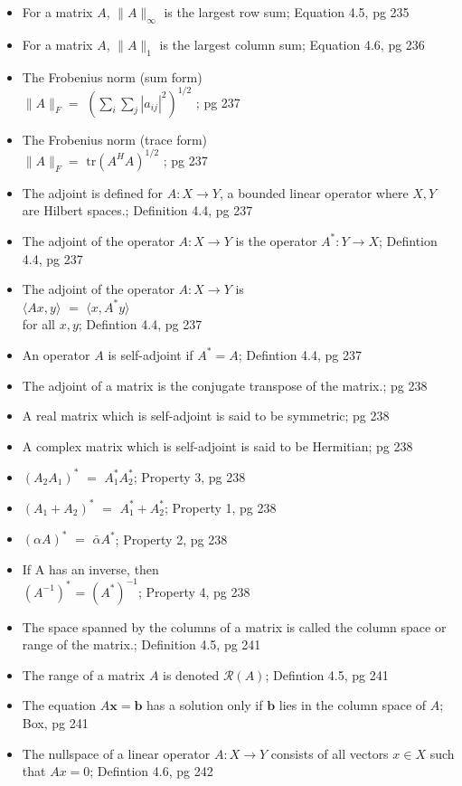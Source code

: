 \documentclass{article}
\begin{document}
\begin{multicols}{2}
\begin{itemize}
\item For a matrix $A$, $\|A\|_{\infty}$ is the largest row sum; Equation 4.5, pg 235
\item For a matrix $A$, $\|A\|_{1}$ is the largest column sum; Equation 4.6, pg 236
\item The Frobenius norm (sum form) \\
$\|A\|_F = $ $ \left( \sum_i \sum_j | a_{ij} |^2 \right)^{1/2} $ ; pg 237
\item The Frobenius norm (trace form) \\
$\|A\|_F = $ $ \mathrm{tr}(A^H A)^{1/2} $ ; pg 237
\item The adjoint is defined for $A: X \to Y$, a bounded linear operator where $X,Y$ are Hilbert spaces.; Definition 4.4, pg 237
\item The adjoint of the operator $A: X \to Y$ is the operator $A^* : Y \to X $; Defintion 4.4, pg 237
\item The adjoint of the operator $A: X \to Y$ is \\
$ \langle Ax, y \rangle$ $=$ $ \langle x, A^* y \rangle$ \\
for all $x, y$; Defintion 4.4, pg 237
\item An operator $A$ is self-adjoint if $A^* = A$; Defintion 4.4, pg 237
\item The adjoint of a matrix is the conjugate transpose of the matrix.; pg 238
\item A real matrix which is self-adjoint is said to be symmetric; pg 238
\item A complex matrix which is self-adjoint is said to be Hermitian; pg 238
\item $ (A_2 A_1)^*$ $=$ $A_1^* A_2^*$; Property 3, pg 238
\item $ (A_1 + A_2)^*$ $=$ $A_1^* + A_2^*$; Property 1, pg 238
\item $ (\alpha A)^*$ $=$ $\bar{\alpha} A^*$; Property 2, pg 238
\item If A has an inverse, then \\
$ (A^{-1})^* $ = $ (A^*)^{-1} $; Property 4, pg 238
\item The space spanned by the columns of a matrix is called the column space or range of the matrix.; Definition 4.5, pg 241
\item The range of a matrix $A$ is denoted $ \mathcal{R} (A) $; Defintion 4.5, pg 241
\item The equation $A\mathbf{x} = \mathbf{b}$ has a solution only if $\mathbf{b}$ lies in the column space of $A$; Box, pg 241
\item The nullspace of a linear operator $A: X \to Y$ consists of all vectors $x \in X$ such that $Ax = 0$; Defintion 4.6, pg 242

\end{itemize}
\end{multicols}
\end{document}
